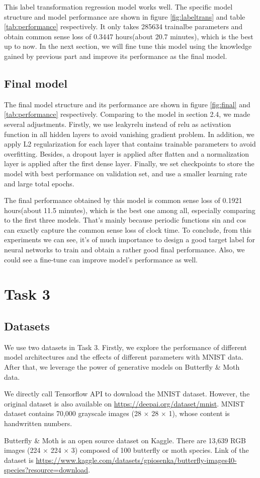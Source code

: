 \documentclass{article}
\begin{document}
This label transformation regression model works well. The specific model structure and model performance are shown in figure \ref{fig:labeltrans} and table \ref{tab:performance} respectively. It only takes 285634 trainalbe parameters and obtain common sense loss of 0.3447 hours(about 20.7 minutes), which is the best up to now. In the next section, we will fine tune this model using the knowledge gained by previous part and improve its performance as the final model.

\subsection{Final model}

The final model structure and its performance are shown in figure \ref{fig:final} and \ref{tab:performance} respectively. Comparing to the model in section 2.4, we made several adjustments. Firstly, we use leakyrelu instead of relu as activation function in all hidden layers to avoid vanishing gradient problem. In addition, we apply L2 regularization for each layer that contains trainable parameters to avoid overfitting. Besides, a dropout layer is applied after flatten and a normalization layer is applied after the first dense layer. Finally, we set checkpoints to store the model with best performance on validation set, and use a smaller learning rate and large total epochs.

The final performance obtained by this model is common sense loss of 0.1921 hours(about 11.5 minutes), which is the best one among all, especially comparing to the first three models. That's mainly because periodic functions sin and cos can exactly capture the common sense loss of clock time. To conclude, from this experiments we can see, it's of much importance to design a good target label for neural networks to train and obtain a rather good final performance.
Also, we could see a fine-tune can improve model's performance as well.
\section*{Task 3}
\setcounter{section}{3}
\subsection{Datasets}
We use two datasets in Task 3. Firstly, we explore the performance of different model architectures and the effects of different parameters with MNIST data. After that, we leverage the power of generative models on Butterfly \& Moth data. \par
We directly call Tensorflow API to download the MNIST dataset. However, the original dataset is also available on \url{https://deepai.org/dataset/mnist}. MNIST dataset contains 70,000 grayscale images (28 $\times$ 28 $\times$ 1), whose content is handwritten numbers. \par
Butterfly \& Moth is an open source dataset on Kaggle. There are 13,639 RGB images (224 $\times$ 224 $\times$ 3) composed of 100 butterfly or moth species. Link of the dataset is \url{https://www.kaggle.com/datasets/gpiosenka/butterfly-images40-species?resource=download}.
\end{document}
